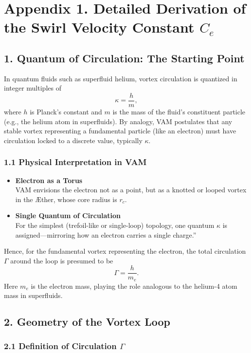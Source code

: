 
\section*{Appendix 1. Detailed Derivation of the Swirl Velocity Constant \(C_e\)}

\subsection*{1. Quantum of Circulation: The Starting Point}

In quantum fluids such as superfluid helium, vortex circulation is quantized in integer multiples of
\[
    \kappa = \frac{h}{m},
\]
where \(h\) is Planck's constant and \(m\) is the mass of the fluid's constituent particle (e.g., the helium atom in superfluids). By analogy, VAM postulates that any stable vortex representing a fundamental particle (like an electron) must have circulation locked to a discrete value, typically \(\kappa\).

\subsubsection*{1.1 Physical Interpretation in VAM}
\begin{itemize}
    \item \textbf{Electron as a Torus} \\
    VAM envisions the electron not as a point, but as a knotted or looped vortex in the Æther, whose core radius is \(r_c\).
    \item \textbf{Single Quantum of Circulation} \\
    For the simplest (trefoil-like or single-loop) topology, one quantum \(\kappa\) is assigned—mirroring how an electron carries a single \grqq charge.\textquotedblright
\end{itemize}

Hence, for the fundamental vortex representing the electron, the total circulation \(\Gamma\) around the loop is presumed to be
\[
    \Gamma = \frac{h}{m_e}.
\]
Here \(m_e\) is the electron mass, playing the role analogous to the helium-4 atom mass in superfluids.

\subsection*{2. Geometry of the Vortex Loop}

\subsubsection*{2.1 Definition of Circulation \(\Gamma\)}


